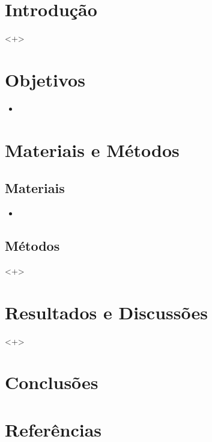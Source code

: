 \documentclass[a4paper, 9pt]{article}
\begin{document}
\begin{multicols*}{2}

\section{Introdução}

	<+>
 
\section{Objetivos}
  \begin{itemize}
   \item <+>
  \end{itemize}

\section{Materiais e Métodos}

  \subsection{Materiais}

  \begin{itemize}
   \item <+>
  \end{itemize}
  
\subsection{Métodos}
	<+>
 
	
\section{Resultados e Discussões}
	<+>

\section{Conclusões}


\section*{Referências}
\footnotesize{
\noindent 
}
\end{multicols*}
\end{document}
